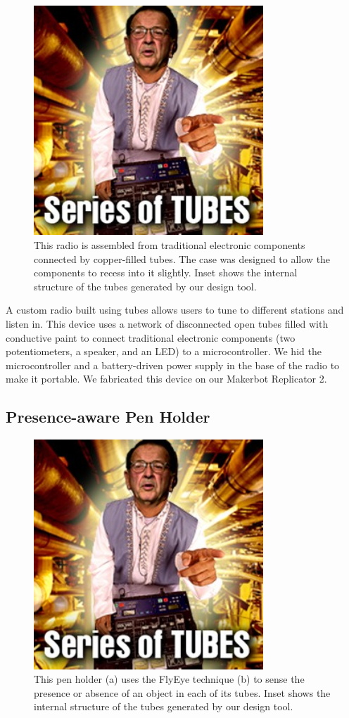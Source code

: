 \begin{figure}[h]
\centering
    \includegraphics[width=3.4in]{figures/series-of-tubes.jpg}
\caption{This radio is assembled from traditional electronic components connected by copper-filled tubes.  The case was designed to allow the components to recess into it slightly.  Inset shows the internal structure of the tubes generated by our design tool.}
\label{fig:radio}
\end{figure}

A custom radio built using tubes allows users to tune to different stations and listen in.  This device uses a network of disconnected open tubes filled with conductive paint to connect traditional electronic components (two potentiometers, a speaker, and an LED) to a microcontroller.  We hid the microcontroller and a battery-driven power supply in the base of the radio to make it portable.  We fabricated this device on our Makerbot Replicator 2.

\subsection{Presence-aware Pen Holder}

\begin{figure}[h]
\centering
    \includegraphics[width=3.4in]{figures/series-of-tubes.jpg}
\caption{This pen holder (a) uses the FlyEye technique (b) to sense the presence or absence of an object in each of its tubes.  Inset shows the internal structure of the tubes generated by our design tool.}
\label{fig:pens}
\end{figure}

